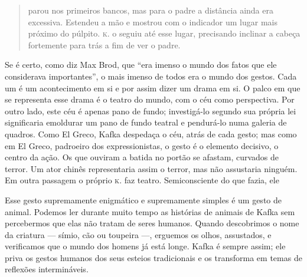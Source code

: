 \begin{quote}
parou nos primeiros bancos, mas para o padre a distância ainda era
excessiva. Estendeu a mão e mostrou com o indicador um lugar mais
próximo do púlpito. \textsc{k.} o seguiu até esse lugar, precisando inclinar a
cabeça fortemente para trás a fim de ver o padre.
\end{quote}

Se é certo, como diz Max Brod, que ``era imenso o mundo dos fatos que
ele considerava importantes'', o mais imenso de todos era o mundo dos
gestos. Cada um é um acontecimento em si e por assim dizer um drama em
si. O palco em que se representa esse drama é o teatro do mundo, com o
céu como perspectiva. Por outro lado, este céu é apenas pano de fundo;
investigá-lo segundo sua própria lei significaria emoldurar um pano de
fundo teatral e pendurá-lo numa galeria de quadros. Como El Greco, Kafka
despedaça o céu, atrás de cada gesto; mas como em El Greco, padroeiro
dos expressionistas, o gesto é o elemento decisivo, o centro da ação. Os
que ouviram a batida no portão se afastam, curvados de terror. Um ator
chinês representaria assim o terror, mas não assustaria ninguém. Em
outra passagem o próprio \textsc{k.} faz teatro. Semiconsciente do que fazia, ele

\begin{quote}
\end{quote}

Esse gesto supremamente enigmático e supremamente
simples é um gesto de animal. Podemos ler durante muito tempo as
histórias de animais de Kafka sem percebermos que elas não tratam de
seres humanos. Quando descobrimos o nome da criatura --- símio, cão ou
toupeira ---, erguemos os olhos, assustados, e verificamos que o mundo
dos homens já está longe. Kafka é sempre assim; ele priva os gestos
humanos dos seus esteios tradicionais e os transforma em temas de
reflexões intermináveis.

